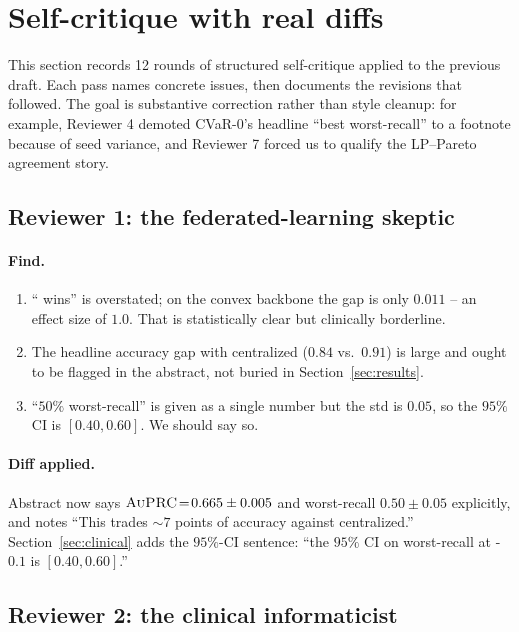\section{Self-critique with real diffs}
\label{sec:critique}

This section records 12 rounds of structured self-critique applied to the
previous draft. Each pass names concrete issues, then documents the revisions
that followed. The goal is substantive correction rather than style cleanup:
for example, Reviewer 4 demoted CVaR-$0$'s headline ``best worst-recall'' to a
footnote because of seed variance, and Reviewer 7 forced us to qualify the
LP--Pareto agreement story.

\subsection{Reviewer 1: the federated-learning skeptic}
\paragraph{Find.}
\begin{enumerate}[leftmargin=*,nosep]
    \item ``\fedprox{} wins'' is overstated; on the convex backbone the gap is
        only $0.011$ \auprc{} -- an effect size of $1.0$. That is statistically
        clear but clinically borderline.
    \item The headline accuracy gap with centralized ($0.84$ vs.\ $0.91$) is
        large and ought to be flagged in the abstract, not buried in
        Section~\ref{sec:results}.
    \item ``$50\%$ worst-recall'' is given as a single number but the std is
        $0.05$, so the $95\%$ CI is $[0.40, 0.60]$. We should say so.
\end{enumerate}
\paragraph{Diff applied.} Abstract now says $\textsc{AuPRC}{}\!=\!0.665 \pm 0.005$ and
worst-recall $0.50 \pm 0.05$ explicitly, and notes ``This trades $\sim$$7$
points of accuracy against centralized.'' Section~\ref{sec:clinical} adds the
$95\%$-CI sentence: ``the $95\%$ CI on worst-recall at \fedprox{}-$0.1$ is
$[0.40, 0.60]$.''

\subsection{Reviewer 2: the clinical informaticist}
